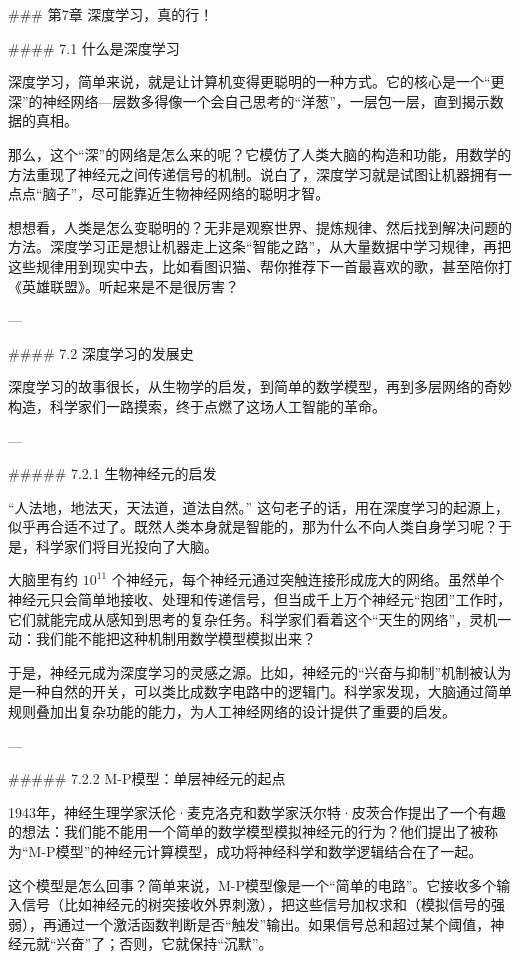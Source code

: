 ### 第7章 深度学习，真的行！

#### 7.1 什么是深度学习

深度学习，简单来说，就是让计算机变得更聪明的一种方式。它的核心是一个“更深”的神经网络---层数多得像一个会自己思考的“洋葱”，一层包一层，直到揭示数据的真相。

那么，这个“深”的网络是怎么来的呢？它模仿了人类大脑的构造和功能，用数学的方法重现了神经元之间传递信号的机制。说白了，深度学习就是试图让机器拥有一点点“脑子”，尽可能靠近生物神经网络的聪明才智。

想想看，人类是怎么变聪明的？无非是观察世界、提炼规律、然后找到解决问题的方法。深度学习正是想让机器走上这条“智能之路”，从大量数据中学习规律，再把这些规律用到现实中去，比如看图识猫、帮你推荐下一首最喜欢的歌，甚至陪你打《英雄联盟》。听起来是不是很厉害？

---

#### 7.2 深度学习的发展史

深度学习的故事很长，从生物学的启发，到简单的数学模型，再到多层网络的奇妙构造，科学家们一路摸索，终于点燃了这场人工智能的革命。

---

##### 7.2.1 生物神经元的启发

“人法地，地法天，天法道，道法自然。” 这句老子的话，用在深度学习的起源上，似乎再合适不过了。既然人类本身就是智能的，那为什么不向人类自身学习呢？于是，科学家们将目光投向了大脑。

大脑里有约 \(10^{11}\) 个神经元，每个神经元通过突触连接形成庞大的网络。虽然单个神经元只会简单地接收、处理和传递信号，但当成千上万个神经元“抱团”工作时，它们就能完成从感知到思考的复杂任务。科学家们看着这个“天生的网络”，灵机一动：我们能不能把这种机制用数学模型模拟出来？

于是，神经元成为深度学习的灵感之源。比如，神经元的“兴奋与抑制”机制被认为是一种自然的开关，可以类比成数字电路中的逻辑门。科学家发现，大脑通过简单规则叠加出复杂功能的能力，为人工神经网络的设计提供了重要的启发。

---

##### 7.2.2 M-P模型：单层神经元的起点

1943年，神经生理学家沃伦·麦克洛克和数学家沃尔特·皮茨合作提出了一个有趣的想法：我们能不能用一个简单的数学模型模拟神经元的行为？他们提出了被称为“M-P模型”的神经元计算模型，成功将神经科学和数学逻辑结合在了一起。

这个模型是怎么回事？简单来说，M-P模型像是一个“简单的电路”。它接收多个输入信号（比如神经元的树突接收外界刺激），把这些信号加权求和（模拟信号的强弱），再通过一个激活函数判断是否“触发”输出。如果信号总和超过某个阈值，神经元就“兴奋”了；否则，它就保持“沉默”。

